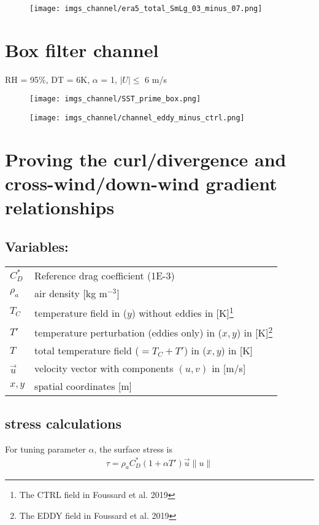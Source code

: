\documentclass[12pt,a4paper]{article}
\begin{document}
\begin{figure}[h!]
\centering
\texttt{[image: imgs\_channel/era5\_total\_SmLg\_03\_minus\_07.png]}
\end{figure}

\section{Box filter channel}
 RH = 95\%, DT = 6K, $\alpha$ = 1, $|U| \leq$ 6 m/s
 
\begin{figure}[h!]
\centering
\texttt{[image: imgs\_channel/SST\_prime\_box.png]}
\end{figure}

\begin{figure}[h!]
\centering
\texttt{[image: imgs\_channel/channel\_eddy\_minus\_ctrl.png]}
\end{figure}








\appendix
\section{Proving the curl/divergence and cross-wind/down-wind gradient relationships}
\subsection*{Variables:}
\begin{table}[h!]
\begin{tabular}{ll}
 $C_D^*$ &  Reference drag coefficient (1E-3) \\
 $\rho_a$ &  air density [kg m$^{-3}$] \\
 $T_C$ & temperature field in ($y$) without eddies in [K]\footnote{The CTRL field in Foussard et al. 2019}  \\
 $T'$ & temperature perturbation (eddies only) in ($x,y$) in [K]\footnote{The EDDY field in Foussard et al. 2019}  \\
  $T$ & total temperature field ($=T_C + T'$) in ($x,y$) in [K]  \\
 $\vec{u}$ & velocity vector with components $(u,v)$ in [m/s] \\
 $x,y$ & spatial coordinates [m]
\end{tabular}
\end{table}

\subsection{stress calculations}
For tuning parameter $\alpha$, the surface stress is 
\begin{align*}
\tau = \rho_a C_D^*(1+\alpha T')\vec{u}\lVert u \rVert
\end{align*}
\end{document}
